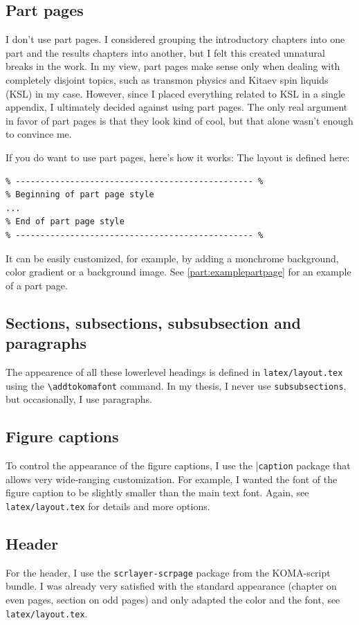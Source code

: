 \subsection{Part pages}
I don't use part pages. I considered grouping the introductory chapters into one part and the results chapters into another, but I felt this created unnatural breaks in the work. In my view, part pages make sense only when dealing with completely disjoint topics, such as transmon physics and Kitaev spin liquids (KSL) in my case. However, since I placed everything related to KSL in a single appendix, I ultimately decided against using part pages.
The only real argument in favor of part pages is that they look kind of cool, but that alone wasn’t enough to convince me.

If you do want to use part pages, here’s how it works: The layout is defined here:
\begin{lstlisting}
% ------------------------------------------------ %
% Beginning of part page style 
...
% End of part page style 
% ------------------------------------------------ %
\end{lstlisting}
It can be easily customized, for example, by adding a monchrome background, color gradient or a background image. See \ref{part:examplepartpage} for an example of a part page.

\subsection{Sections, subsections, subsubsection and paragraphs}
The appearence of all these lowerlevel headings is defined in \verb|latex/layout.tex| using the \verb|\addtokomafont| command. In my thesis, I never use \verb|subsubsections|, but occasionally, I use paragraphs.

\subsection{Figure captions}
To control the appearance of the figure captions, I use the |\verb|caption| package that allows very wide-ranging customization. For example, I wanted the font of the figure caption to be slightly smaller than the main text font. Again, see \verb|latex/layout.tex| for details and more options.

\subsection{Header}
For the header, I use the \verb|scrlayer-scrpage| package from the KOMA-script bundle. I was already very satisfied with the standard appearance (chapter on even pages, section on odd pages) and only adapted the color and the font, see \verb|latex/layout.tex|.

